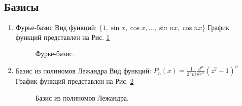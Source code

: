 \documentclass{config}
\begin{document}
\subsection{Базисы}
\begin{enumerate}
    \item Фурье-базис\newline
Вид функций: $\{1, \sin{x}, \cos{x}, ..., \sin{nx}, \cos{nx}\}$ \newline
График функций представлен на Рис. \ref{basis_fourier}

\begin{figure}[h!]
    \caption{Фурье-базис.}
    \label{basis_fourier}
\end{figure}

    \item Базис из полиномов Лежандра\newline
Вид функций: $P_n(x) = \frac{1}{2^n n!} \frac{d^n}{dx^n} (z^2 - 1)^n$ \newline
График функций представлен на Рис. \ref{basis_legendre}

\begin{figure}[h!]
    \caption{Базис из полиномов Лежандра.}
    \label{basis_legendre}
\end{figure}


\end{enumerate}
\end{document}

